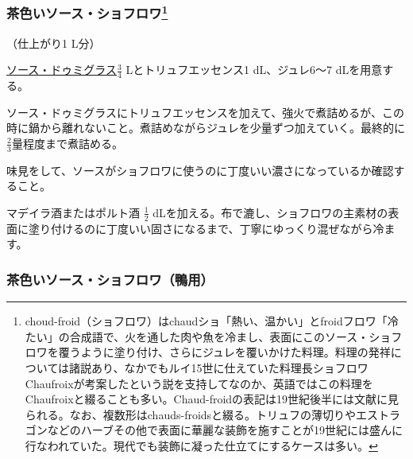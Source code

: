 \begin{recette}
{\subsubsection[茶色いソース・ショフロワ]{\texorpdfstring{茶色いソース・ショフロワ\footnote{choud-froid（ショフロワ）はchaudショ「熱い、温かい」とfroidフロワ「冷たい」の合成語で、火を通した肉や魚を冷まし、表面にこのソース・ショフロワを覆うように塗り付け、さらにジュレを覆いかけた料理。料理の発祥については諸説あり、なかでもルイ15世に仕えていた料理長ショフロワChaufroixが考案したという説を支持してなのか、英語ではこの料理をChaufroixと綴ることも多い。Chaud-froidの表記は19世紀後半には文献に見られる。なお、複数形はchauds-froidsと綴る。トリュフの薄切りやエストラゴンなどのハーブその他で表面に華麗な装飾を施すことが19世紀には盛んに行なわれていた。現代でも装飾に凝った仕立てにするケースは多い。}}{茶色いソース・ショフロワ}}\label{sauce-chaud-froid-brune}}



（仕上がり1 L分）

\protect\hyperlink{sauce-demi-glace}{ソース・ドゥミグラス}\(\frac{3}{4}\)
Lとトリュフエッセンス1 dL、ジュレ6〜7 dLを用意する。

ソース・ドゥミグラスにトリュフエッセンスを加えて、強火で煮詰めるが、この時に鍋から離れないこと。煮詰めながらジュレを少量ずつ加えていく。最終的に\(\frac{2}{3}\)量程度まで煮詰める。

味見をして、ソースがショフロワに使うのに丁度いい濃さになっているか確認すること。

マデイラ酒またはポルト酒 \(\frac{1}{2}\)
dLを加える。布で漉し、ショフロワの主素材の表面に塗り付けるのに丁度いい固さになるまで、丁寧にゆっくり混ぜながら冷ます。

\hypertarget{sauce-chaud-froid-brune-pour-canards}{%
\subsubsection{茶色いソース・ショフロワ（鴨用）}\label{sauce-chaud-froid-brune-pour-canards}}




\end{recette}
